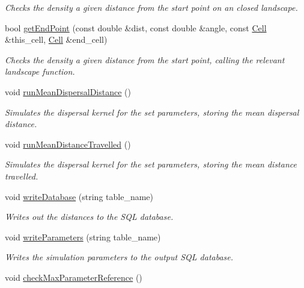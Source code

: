 \begin{DoxyCompactItemize}
\begin{DoxyCompactList}\small\item\em Checks the density a given distance from the start point on an closed landscape. \end{DoxyCompactList}\item 
bool \hyperlink{class_simulate_dispersal_a10a1dd769e993d018e7c7ae9208240ab}{get\+End\+Point} (const double \&dist, const double \&angle, const \hyperlink{struct_cell}{Cell} \&this\+\_\+cell, \hyperlink{struct_cell}{Cell} \&end\+\_\+cell)
\begin{DoxyCompactList}\small\item\em Checks the density a given distance from the start point, calling the relevant landscape function. \end{DoxyCompactList}\item 
void \hyperlink{class_simulate_dispersal_a4a759f6bb3b8288345eaf7c0d66ad29e}{run\+Mean\+Dispersal\+Distance} ()\hypertarget{class_simulate_dispersal_a4a759f6bb3b8288345eaf7c0d66ad29e}{}\label{class_simulate_dispersal_a4a759f6bb3b8288345eaf7c0d66ad29e}

\begin{DoxyCompactList}\small\item\em Simulates the dispersal kernel for the set parameters, storing the mean dispersal distance. \end{DoxyCompactList}\item 
void \hyperlink{class_simulate_dispersal_a406514e917874907cfb7a8d6c7889098}{run\+Mean\+Distance\+Travelled} ()\hypertarget{class_simulate_dispersal_a406514e917874907cfb7a8d6c7889098}{}\label{class_simulate_dispersal_a406514e917874907cfb7a8d6c7889098}

\begin{DoxyCompactList}\small\item\em Simulates the dispersal kernel for the set parameters, storing the mean distance travelled. \end{DoxyCompactList}\item 
void \hyperlink{class_simulate_dispersal_af7d0a726cb3724c159ca46f4586a8bd3}{write\+Database} (string table\+\_\+name)
\begin{DoxyCompactList}\small\item\em Writes out the distances to the S\+QL database. \end{DoxyCompactList}\item 
void \hyperlink{class_simulate_dispersal_ae0afed6eeb06f5bae4ee13a24850c8c5}{write\+Parameters} (string table\+\_\+name)
\begin{DoxyCompactList}\small\item\em Writes the simulation parameters to the output S\+QL database. \end{DoxyCompactList}\item 
void \hyperlink{class_simulate_dispersal_a0dee5d1529bd7ee6f382f7cd1b5393e5}{check\+Max\+Parameter\+Reference} ()\hypertarget{class_simulate_dispersal_a0dee5d1529bd7ee6f382f7cd1b5393e5}{}\label{class_simulate_dispersal_a0dee5d1529bd7ee6f382f7cd1b5393e5}


\end{DoxyCompactItemize}
